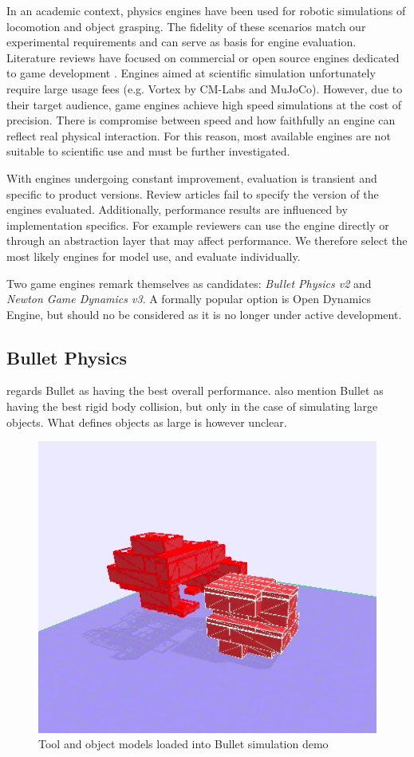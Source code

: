 \documentclass[11]{article}
\begin{document}
In an academic context, physics engines have been used for robotic simulations of locomotion and object grasping.
The fidelity of these scenarios match our experimental requirements and can serve as basis for engine evaluation. 
Literature reviews have focused on commercial or open source engines dedicated to game development \cite{boeing2007,roennau2013,hummel2012}. 
Engines aimed at scientific simulation unfortunately require large usage fees (e.g. Vortex by CM-Labs and MuJoCo).
However, due to their target audience, game engines achieve high speed simulations at the cost of precision. 
There is compromise between speed and how faithfully an engine can reflect real physical interaction.
For this reason, most available engines are not suitable to scientific use and must be further investigated. 

With engines undergoing constant improvement, evaluation is transient and specific to product versions. 
Review articles fail to specify the version of the engines evaluated.
Additionally, performance results are influenced by implementation specifics.
For example reviewers can use the engine directly or through an abstraction layer that may affect performance.  
We therefore select the most likely engines for model use, and evaluate individually. 

Two game engines remark themselves as candidates: \emph{Bullet Physics v2} and \emph{Newton Game Dynamics v3}.
A formally popular option is Open Dynamics Engine, but should no be considered as it is no longer under active development. 

\subsection{Bullet Physics}
\cite{boeing2007} regards Bullet as having the best overall performance. 
\cite{hummel2012,roennau2013} also mention Bullet as having the best rigid body collision, but only in the case of simulating large objects.
What defines objects as large is however unclear. 

\begin{figure}[h]
  \centering
  \includegraphics[width=.5\textwidth]{./figures/bullet_demo.png}
  \caption{Tool and object models loaded into Bullet simulation demo}
  \label{fig:bullet_demo}
\end{figure}      
\end{document}

